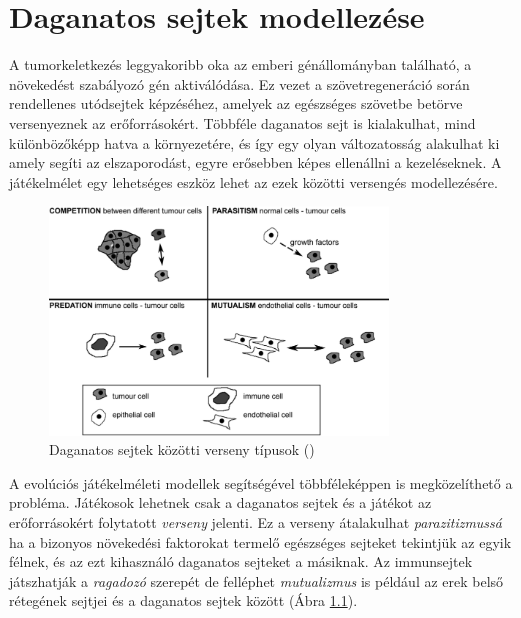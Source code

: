 \chapter{Daganatos sejtek modellezése}
A tumorkeletkezés leggyakoribb oka az emberi génállományban található, a növekedést szabályozó gén aktiválódása. Ez vezet a szövetregeneráció során rendellenes utódsejtek képzéséhez, amelyek az egészséges szövetbe betörve versenyeznek az erőforrásokért. Többféle daganatos sejt is kialakulhat, mind különbözőképp hatva a környezetére, és így egy olyan változatosság alakulhat ki amely segíti az elszaporodást, egyre erősebben képes ellenállni a kezeléseknek. A játékelmélet egy lehetséges eszköz lehet az ezek közötti versengés modellezésére.

\begin{figure}[h!]
	\centering
	\includegraphics[width=90mm]{images/models}
	\vspace*{2mm}
	\caption{Daganatos sejtek közötti verseny típusok (\cite{hummert2014evolutionary})}
	\label{fig:cancerModels}
\end{figure}

A evolúciós játékelméleti modellek segítségével többféleképpen is megközelíthető a probléma. Játékosok lehetnek csak a daganatos sejtek és a játékot az erőforrásokért folytatott \textit{verseny} jelenti. Ez a verseny átalakulhat \textit{parazitizmussá} ha a bizonyos növekedési faktorokat termelő egészséges sejteket tekintjük az egyik félnek, és az ezt kihasználó daganatos sejteket a másiknak. Az immunsejtek játszhatják a \textit{ragadozó} szerepét de felléphet \textit{mutualizmus} is például az erek belső rétegének sejtjei és a daganatos sejtek között (Ábra \ref{fig:cancerModels}). 


